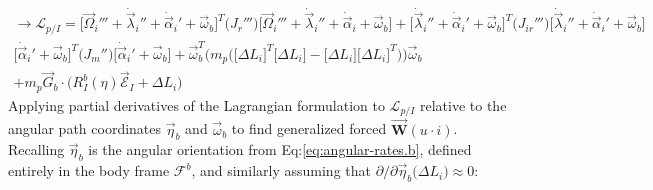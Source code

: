 \begin{multline}
\rightarrow\mathcal{L}_{p/I}=\Big[\vec{\Omega}_i'''+\dot{\vec{\lambda}}_i''+\dot{\vec{\alpha}}_i'+\vec{\omega}_b\Big]^T\big(J_r'''\big)\Big[\vec{\Omega}_i'''+\dot{\vec{\lambda}}_i''+\dot{\vec{\alpha}}_i+\vec{\omega}_b\Big]+\Big[\dot{\vec{\lambda}}_i''+\dot{\vec{\alpha}}_i'+\vec{\omega}_b\Big]^T\big(J_{ir}'''\big)\Big[\dot{\vec{\lambda}}_i''+\dot{\vec{\alpha}}_i'+\vec{\omega}_b\Big]
\\
\Big[\dot{\vec{\alpha}}_i'+\vec{\omega}_b\Big]^T\big(J_m''\big)\Big[\dot{\vec{\alpha}}_i'+\vec{\omega}_b\Big]+\vec{\omega}_{b}^T\big(m_p\Big(\big[\Delta L_i\big]^T\big[\Delta L_i\big]-\big[\Delta L_i\big]\big[\Delta L_i\big]^T\Big)\big)\vec{\omega}_{b}
\\
+m_p\vec{G}_b\cdot\big(R_I^b(\eta)\vec{\mathcal{E}}_I+\Delta L_i\big)
\end{multline}
Applying partial derivatives of the Lagrangian formulation to $\mathcal{L}_{p/I}$ relative to the angular path coordinates $\vec{\eta}_b$ and $\vec{\omega}_b$ to find generalized forced $\vec{\mathbf{W}}(u\cdot i)$. Recalling $\vec{\eta}_b$ is the angular orientation from Eq:\ref{eq:angular-rates.b}, defined entirely in the body frame $\mathcal{F}^b$, and similarly assuming that $\partial/\partial\vec{\eta}_b\big(\Delta L_i\big)\approx 0$:
